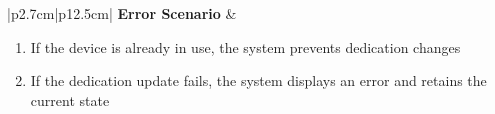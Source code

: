 \begin{table}[H]
\begin{tabular}{|p{2.7cm}|p{12.5cm}|}
        \hline
        \textbf{Error Scenario} & \begin{minipage}[t]{\linewidth}
                                      \begin{enumerate}[topsep=0pt,itemsep=1pt,parsep=0pt,partopsep=0pt]
                                          \item If the device is already in use, the system prevents dedication changes
                                          \item If the dedication update fails, the system displays an error and retains the
                                                current state
                                      \end{enumerate}
                                  \end{minipage}   \\
        \hline
    \end{tabular}
    \label{tab:admin-dedicated-devices}
\end{table}
